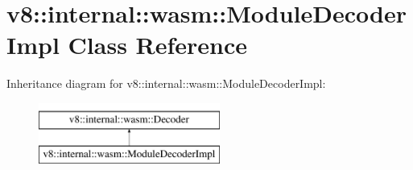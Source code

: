 \hypertarget{classv8_1_1internal_1_1wasm_1_1ModuleDecoderImpl}{}\section{v8\+:\+:internal\+:\+:wasm\+:\+:Module\+Decoder\+Impl Class Reference}
\label{classv8_1_1internal_1_1wasm_1_1ModuleDecoderImpl}
Inheritance diagram for v8\+:\+:internal\+:\+:wasm\+:\+:Module\+Decoder\+Impl\+:\begin{figure}[H]
\begin{center}
\leavevmode
\includegraphics[height=2.000000cm]{classv8_1_1internal_1_1wasm_1_1ModuleDecoderImpl}
\end{center}
\end{figure}
